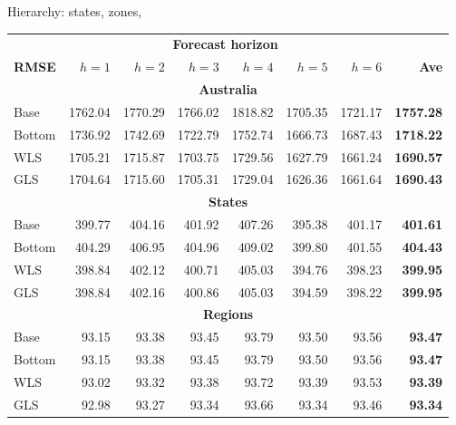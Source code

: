 \documentclass[14pt]{beamer}
\def\hl{\color[RGB]{6,84,182}}
\begin{document}
\begin{frame}{Hierarchy: states, zones, }\vspace*{-0.2cm}
\fontsize{10}{10.5}\sf\tabcolsep=0.12cm
\hspace*{-0.2cm}\begin{tabular}{lrrrrrrr}
            & \multicolumn{6}{c}{\bf Forecast horizon} & \\
\textbf{RMSE} & $h=1$  & $h=2$ & $h=3$ & $h=4$ & $h=5$ & $h=6$ & \textbf{Ave}\\
\midrule
\multicolumn{8}{c}{\bf\alert{Australia}}\\
Base   & 1762.04    & 1770.29    & 1766.02     & 1818.82    & 1705.35    & 1721.17    & \bf 1757.28 \\
Bottom & 1736.92    & 1742.69    & 1722.79     & 1752.74    & 1666.73    & 1687.43    & \bf 1718.22 \\
WLS    & 1705.21    & 1715.87    & \hl 1703.75 & 1729.56    & 1627.79    & \hl1661.24 & \bf 1690.57 \\
GLS    & \hl1704.64 & \hl1715.60 & 1705.31     & \hl1729.04 & \hl1626.36 & 1661.64    & \bf \hl 1690.43 \\[0.1cm]
\multicolumn{8}{c}{\bf\alert{States}}\\
Base   & 399.77     & 404.16     & 401.92      & 407.26     & 395.38     & 401.17     & \bf 401.61 \\
Bottom & 404.29     & 406.95     & 404.96      & 409.02     & 399.80     & 401.55     & \bf 404.43 \\
WLS    & \hl 398.84 & \hl 402.12 & \hl 400.71  & \hl 405.03 & 394.76     & 398.23     & \bf \hl 399.95 \\
GLS    & \hl 398.84 & 402.16     & 400.86      & \hl 405.03 & \hl 394.59 & \hl 398.22 & \bf \hl 399.95 \\[0.1cm]
\multicolumn{8}{c}{\bf\alert{Regions}}\\
Base   & 93.15      & 93.38      & 93.45       & 93.79      & 93.50      & 93.56      & \bf 93.47 \\
Bottom & 93.15      & 93.38      & 93.45       & 93.79      & 93.50      & 93.56      & \bf 93.47 \\
WLS    & 93.02      & 93.32      & 93.38       & 93.72      & 93.39      & 93.53      & \bf 93.39 \\
GLS    & \hl 92.98  & \hl 93.27  & \hl 93.34   & \hl 93.66  & \hl 93.34  & \hl 93.46  & \bf \hl 93.34 \\
\end{tabular}
\end{frame}
\end{document}
